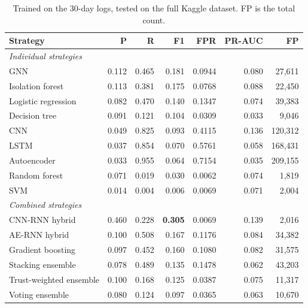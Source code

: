 \begin{table}[H]
\centering
\small
\begin{tabular}{lrrrrrr}
\toprule
Strategy & P & R & F1 & FPR & PR-AUC & FP \\
\midrule
\multicolumn{7}{l}{\textit{Individual strategies}} \\
GNN & 0.112 & 0.465 & 0.181 & 0.0944 & 0.080 & 27,611 \\
Isolation forest & 0.113 & 0.381 & 0.175 & 0.0768 & 0.088 & 22,450 \\
Logistic regression & 0.082 & 0.470 & 0.140 & 0.1347 & 0.074 & 39,383 \\
Decision tree & 0.091 & 0.121 & 0.104 & 0.0309 & 0.033 & 9,046 \\
CNN & 0.049 & 0.825 & 0.093 & 0.4115 & 0.136 & 120,312 \\
LSTM & 0.037 & 0.854 & 0.070 & 0.5761 & 0.058 & 168,431 \\
Autoencoder & 0.033 & 0.955 & 0.064 & 0.7154 & 0.035 & 209,155 \\
Random forest & 0.071 & 0.019 & 0.030 & 0.0062 & 0.074 & 1,819 \\
SVM & 0.014 & 0.004 & 0.006 & 0.0069 & 0.071 & 2,004 \\
\midrule
\multicolumn{7}{l}{\textit{Combined strategies}} \\
CNN-RNN hybrid & 0.460 & 0.228 & \textbf{0.305} & 0.0069 & 0.139 & 2,016 \\
AE-RNN hybrid & 0.100 & 0.508 & 0.167 & 0.1176 & 0.084 & 34,382 \\
Gradient boosting & 0.097 & 0.452 & 0.160 & 0.1080 & 0.082 & 31,575 \\
Stacking ensemble & 0.078 & 0.489 & 0.135 & 0.1478 & 0.062 & 43,203 \\
Trust-weighted ensemble & 0.100 & 0.168 & 0.125 & 0.0387 & 0.075 & 11,317 \\
Voting ensemble & 0.080 & 0.124 & 0.097 & 0.0365 & 0.063 & 10,670 \\
\bottomrule
\end{tabular}
\caption{Trained on the 30-day logs, tested on the full Kaggle dataset. FP is the total count.}
\label{tab:generalise-month}
\end{table}
